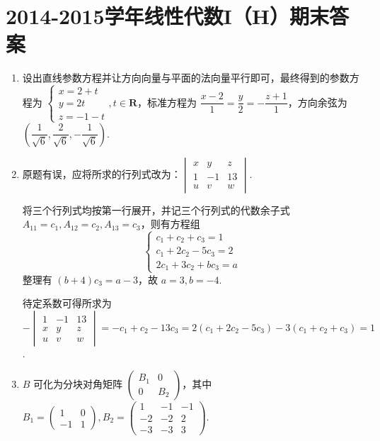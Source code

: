 \section{2014-2015学年线性代数I（H）期末答案}

\begin{enumerate}
    \item 设出直线参数方程并让方向向量与平面的法向量平行即可，最终得到的参数方程为 $\begin{cases}
        x=2+t\\
        y=2t\\
        z=-1-t
    \end{cases},t\in\mathbf{R}$，标准方程为 $\dfrac{x-2}{1}=\dfrac{y}{2}=-\dfrac{z+1}{1}$，方向余弦为 $(\dfrac{1}{\sqrt{6}},\dfrac{2}{\sqrt{6}},-\dfrac{1}{\sqrt{6}})$.

    \item 原题有误，应将所求的行列式改为：$\begin{vmatrix}
        x & y & z \\
        1 & -1 & 13 \\
        u & v & w
    \end{vmatrix}$.

    将三个行列式均按第一行展开，并记三个行列式的代数余子式 $A_{11} = c_1, A_{12} = c_2, A_{13} = c_3$，则有方程组
    \[
        \begin{cases}
            c_1 + c_2 + c_3 = 1\\
            c_1 + 2c_2 - 5c_3 = 2\\
            2c_1 + 3c_2 + bc_3 = a
        \end{cases}
    \]
    整理有 $(b+4)c_3 = a-3$，故 $a=3, b=-4$.

    待定系数可得所求为 $-\begin{vmatrix}
        1 & -1 & 13 \\
        x & y & z \\
        u & v & w
    \end{vmatrix} = -c_1 + c_2 - 13c_3 = 2(c_1 + 2c_2 - 5c_3) - 3(c_1 + c_2 + c_3) = 1$.

    \item $B$ 可化为分块对角矩阵 $\begin{pmatrix}
        B_1 & 0 \\
        0 & B_2
    \end{pmatrix}$，其中 $B_1 = \begin{pmatrix}
        1 & 0 \\
        -1 & 1
    \end{pmatrix}, B_2 = \begin{pmatrix}
        1 & -1 & -1 \\
        -2 & -2 & 2 \\
        -3 & -3 & 3
    \end{pmatrix}$.


\end{enumerate}
